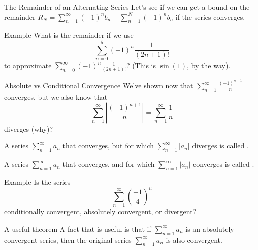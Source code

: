 \documentclass[presentation]{beamer}
\begin{document}
\begin{frame}[label={sec:orgfef8c6e}]{The Remainder of an Alternating Series}
Let's see if we can get a bound on the remainder \(R_N =
\sum\limits_{n=1}^{\infty} \left( -1 \right)^n b_n -
\sum\limits_{n=1}^{N} \left( -1 \right)^n b_n\) if the series converges.
\vspace{10in}
\end{frame}

\begin{frame}[label={sec:org677b8c8}]{Example}
What is the remainder if we use \[ \sum\limits_{n=0}^5 \left( -1
\right)^n \frac{1}{\left( 2n+1 \right)!}\] to approximate
\(\sum\limits_{n=0}^{\infty} \left( -1 \right)^n \frac{1}{\left( 2n+1
\right)!}\)?  (This is \(\sin(1)\), by the way).
\vspace{10in}
\end{frame}

\begin{frame}[label={sec:org2f43ec6}]{Absolute vs Conditional Convergence}
We've shown now that \(\sum\limits_{n=1}^{\infty} \frac{\left( -1 \right)^{n+1}}{n}\) converges,
but we also know that
\[
\sum\limits_{n=1}^{\infty} \left| \frac{\left( -1 \right)^{n+1}}{n} \right| = \sum\limits_{n=1}^{\infty} \frac{1}{n}\]
\alert{diverges} (why)?

A series \(\sum\limits_{n=1}^{\infty} a_n\) that converges, but for which
\(\sum\limits_{n=1}^{\infty} \left| a_n \right|\) diverges is called
\uline{\hspace*{1in}}.

A series \(\sum\limits_{n=1}^{\infty} a_n\) that converges, and for which
\(\sum\limits_{n=1}^{\infty} \left| a_n \right|\) converges is called
\uline{\hspace*{1in}}.
\end{frame}

\begin{frame}[label={sec:org9385a54}]{Example}
Is the series
\[
\sum\limits_{n=1}^{\infty} \left( \frac{-1}{4} \right)^n\]
conditionally convergent, absolutely convergent, or divergent?
\vspace{1in}
\end{frame}

\begin{frame}[label={sec:org349afaf}]{A useful theorem}
A fact that is useful is that if \(\sum\limits_{n=1}^{\infty} a_n\) is an absolutely
convergent series, then the original series \(\sum\limits_{n=1}^{\infty} a_n\) is also
convergent.
\vspace{10in}
\end{frame}
\end{document}
